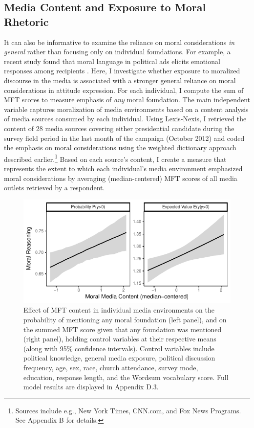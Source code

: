 \documentclass[12pt]{article}
\begin{document}
\subsection*{Media Content and Exposure to Moral Rhetoric}

It can also be informative to examine the reliance on moral considerations \textit{in general} rather than focusing only on individual foundations. For example, a recent study found that moral language in political ads elicits emotional responses among recipients \citep{lipsitz2017playing}. Here, I investigate whether exposure to moralized discourse in the media is associated with a stronger general reliance on moral considerations in attitude expression. For each individual, I compute the sum of MFT scores to measure emphasis of \textit{any} moral foundation. The main independent variable captures moralization of media environments based on a content analysis of media sources consumed by each individual. Using Lexis-Nexis, I retrieved the content of 28 media sources covering either presidential candidate during the survey field period in the last month of the campaign (October 2012) and coded the emphasis on moral considerations using the weighted dictionary approach described earlier.\footnote{Sources include e.g., New York Times, CNN.com, and Fox News Programs. See Appendix B for details.} Based on each source's content, I create a measure that represents the extent to which each individual's media environment emphasized moral considerations by averaging (median-centered) MFT scores of all media outlets retrieved by a respondent.

\begin{figure}[h]\centering
\includegraphics{../calc/fig/tobit_media.pdf}
\caption{Effect of MFT content in individual media environments on the probability of mentioning any moral foundation (left panel), and on the summed MFT score given that any foundation was mentioned (right panel), holding control variables at their respective means (along with 95\% confidence intervals). Control variables include political knowledge, general media exposure, political discussion frequency, age, sex, race, church attendance, survey mode, education, response length, and the Wordsum vocabulary score. Full model results are displayed in Appendix D.3.
}\label{fig:tobit_media}
\end{figure}
\end{document}
